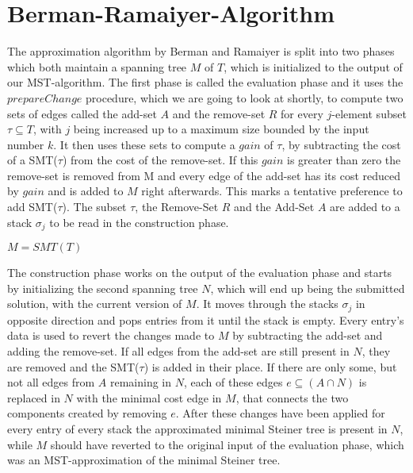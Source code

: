 \section{Berman-Ramaiyer-Algorithm}

The approximation algorithm by Berman and Ramaiyer is split into two phases which both maintain a spanning tree $M$ of $T$, which is initialized to the output of our MST-algorithm. The first phase is called the evaluation phase and it uses the $prepareChange$ procedure, which we are going to look at shortly, to compute two sets of edges called the add-set $A$ and the remove-set $R$ for every $j$-element subset $\tau \subseteq T$, with $j$ being increased up to a maximum size bounded by the input number $k$. It then uses these sets to compute a $gain$ of $\tau$, by subtracting the cost of a SMT($\tau$) from the cost of the remove-set. If this $gain$ is greater than zero the remove-set is removed from M and every edge of the add-set has its cost reduced by $gain$ and is added to $M$ right afterwards. This marks a tentative preference to add SMT($\tau$). The subset $\tau$, the Remove-Set $R$ and the Add-Set $A$ are added to a stack $\sigma_j$ to be read in the construction phase.

\begin{algorithm}[h!]
$M = SMT(T)$\;						
\label{fig:evaluationPseudo}
\end{algorithm}

The construction phase works on the output of the evaluation phase and starts by initializing the second spanning tree $N$, which will end up being the submitted solution, with the current version of $M$. It moves through the stacks $\sigma_j$ in opposite direction and pops entries from it until the stack is empty. Every entry's data is used to revert the changes made to $M$ by subtracting the add-set and adding the remove-set. If all edges from the add-set are still present in $N$, they are removed and the SMT($\tau$) is added in their place. If there are only some, but not all edges from $A$ remaining in $N$, each of these edges $e \subseteq (A\cap N)$ is replaced in $N$ with the minimal cost edge in $M$, that connects the two components created by removing $e$. After these changes have been applied for every entry of every stack the approximated minimal Steiner tree is present in $N$, while $M$ should have reverted to the original input of the evaluation phase, which was an MST-approximation of the minimal Steiner tree. 

